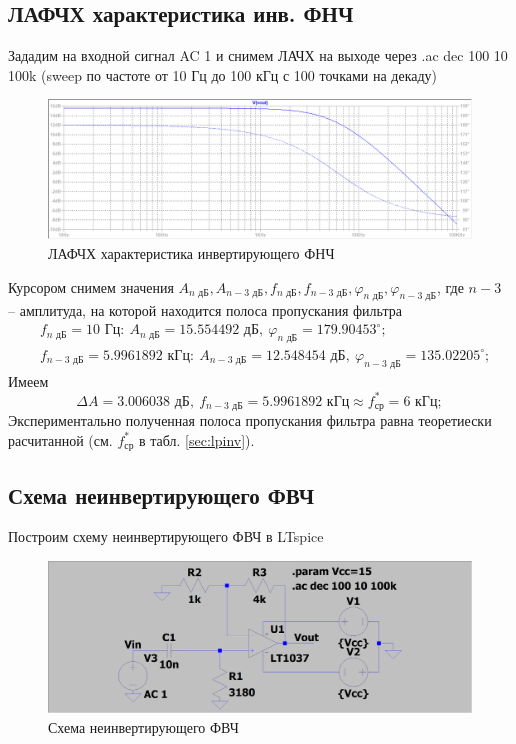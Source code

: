 \documentclass[a4paper, 12pt]{article}
\begin{document}
    \subsection{ЛАФЧХ характеристика инв. ФНЧ}
    Зададим на входной сигнал AC 1 и снимем ЛАЧХ на выходе через .ac dec 100 10 100k (sweep по частоте от 10 Гц до 100 кГц с 100 точками на декаду)
    \begin{figure}[H]
        \centering
        \includegraphics[scale=0.46]{1task_lapfr.png}
        \captionsetup{skip=0pt}
        \caption{ЛАФЧХ характеристика инвертирующего ФНЧ}
        \label{fig:1task_lapfr}
    \end{figure}
    \noindent Курсором снимем значения $A_{n\text{ дБ}},A_{n-3\text{ дБ}},f_{n\text{ дБ}}, f_{n-3\text{ дБ}},\varphi_{n\text{ дБ}}, \varphi_{n-3\text{ дБ}}$,
    где $n-3$ -- амплитуда, на которой находится полоса пропускания фильтра
    \begin{align*}
    &f_{n\text{ дБ}}=10\text{ Гц}:\ A_{n\text{ дБ}}=15.554492\text{ дБ},\ \varphi_{n\text{ дБ}}=179.90453^{\circ};\\
    &f_{n-3\text{ дБ}}=5.9961892 \text{ кГц}:\ A_{n-3\text{ дБ}}=12.548454\text{ дБ},\ \varphi_{n-3\text{ дБ}}=135.02205^{\circ};
    \end{align*}
    Имеем
    $$
    \Delta A=3.006038\text{ дБ},\ f_{n-3\text{ дБ}}=5.9961892\text{ кГц}\approx f_\text{ср}^*=6\text{ кГц};
    $$
    Экспериментально полученная полоса пропускания фильтра равна теоретиески расчитанной (см. $f_\text{ср}^*$ в табл. \ref{sec:lpinv}).


    \subsection{Схема неинвертирующего ФВЧ}
    Построим схему неинвертирующего ФВЧ в LTspice
    \begin{figure}[H]
        \centering
        \includegraphics[scale=0.22]{scheme2.png}
        \captionsetup{skip=0pt}
        \caption{Схема неинвертирующего ФВЧ}
        \label{fig:scheme2}
    \end{figure}
\end{document}
